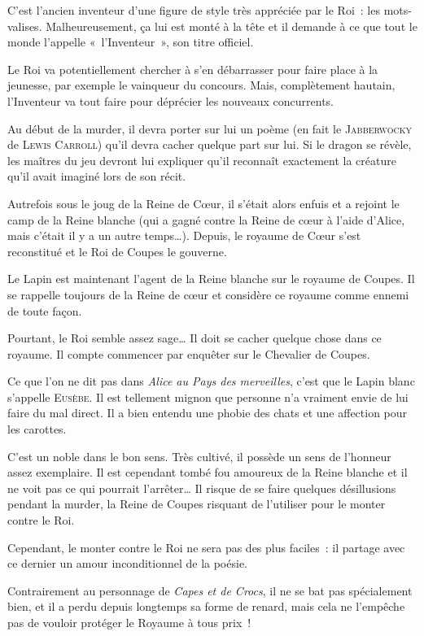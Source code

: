 {
{
C’est l’ancien inventeur d’une figure de style très appréciée par le Roi~:  les mots-valises.
Malheureusement, ça lui est monté à la tête et il demande à ce que tout le monde l’appelle «~l’Inventeur~», son titre officiel.

Le Roi va potentiellement chercher à s’en débarrasser pour faire place à la jeunesse, par exemple le vainqueur du concours.
Mais, complètement hautain, l’Inventeur va tout faire pour déprécier les nouveaux concurrents.

Au début de la murder, il devra porter sur lui un poème (en fait le \textsc{Jabberwocky} de \textsc{Lewis Carroll}) qu’il devra cacher quelque part sur lui.
Si le dragon se révèle, les maîtres du jeu devront lui expliquer qu’il reconnaît exactement la créature qu’il avait imaginé lors de son récit.
}

{
Autrefois sous le joug de la Reine de Cœur, il s’était alors enfuis et a rejoint le camp de la Reine blanche (qui a gagné contre la Reine de cœur à l’aide d’Alice, mais c’était il y a un autre temps…).
Depuis, le royaume de Cœur s’est reconstitué et le Roi de Coupes le gouverne.

Le Lapin est maintenant l’agent de la Reine blanche sur le royaume de Coupes.
Il se rappelle toujours de la Reine de cœur et considère ce royaume comme ennemi de toute façon.

Pourtant, le Roi semble assez sage…  Il doit se cacher quelque chose dans ce royaume.
Il compte commencer par enquêter sur le Chevalier de Coupes.

Ce que l’on ne dit pas dans \textit{Alice au Pays des merveilles}, c’est que le Lapin blanc s’appelle \textsc{Eusèbe}.
Il est tellement mignon que personne n’a vraiment envie de lui faire du mal direct.
Il a bien entendu une phobie des chats et une affection pour les carottes.
}

{
C’est un noble dans le bon sens.  Très cultivé, il possède un sens de l’honneur assez exemplaire.
Il est cependant tombé fou amoureux de la Reine blanche et il ne voit pas ce qui pourrait l’arrêter…
Il risque de se faire quelques désillusions pendant la murder, la Reine de Coupes risquant de l’utiliser pour le monter contre le Roi.

Cependant, le monter contre le Roi ne sera pas des plus faciles~:  il partage avec ce dernier un amour inconditionnel de la poésie.

Contrairement au personnage de \textit{Capes et de Crocs}, il ne se bat pas spécialement bien, et il a perdu depuis longtemps sa forme de renard, mais cela ne l’empêche pas de vouloir protéger le Royaume à tous prix~!
}

}
